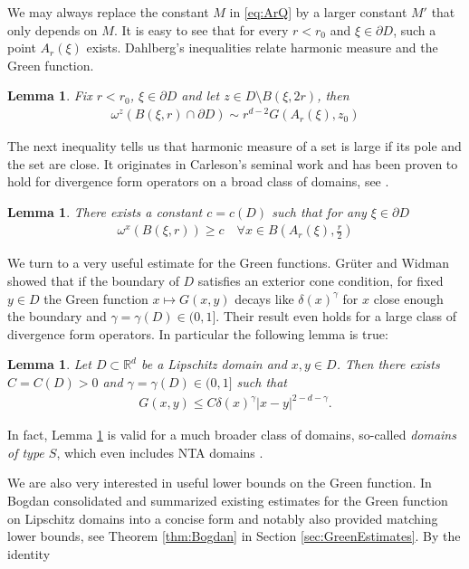 \documentclass[a4paper,12pt]{article}
\newtheorem{lemma}[theorem]{Lemma}
\theoremstyle{definition}
\theoremstyle{definition}
\begin{document}
	We may always replace the constant $M$ in \eqref{eq:ArQ} by a larger constant $M'$ that only depends on $M$. It is easy to see that for every $r<r_0$ and $\xi\in\partial D$, such a point $A_r(\xi)$ exists. Dahlberg's inequalities \cite{Dahlberg1977} relate harmonic measure and the Green function.
	\begin{lemma}\label{lem:Dahlberg}
		Fix $r<r_0$, $\xi\in\partial D$ and let $z\in D\setminus B(\xi,2r)$, then
		\begin{align}\label{eq:Dahlberg}
			\omega^z(B(\xi,r)\cap \partial D)\sim r^{d-2}G(A_r(\xi),z_0)
		\end{align}
	\end{lemma}
	The next inequality tells us that harmonic measure of a set is large if its pole and the set are close. It originates in Carleson's seminal work \cite{Carleson62} and has been proven to hold for divergence form operators on a broad class of domains, see \cite{Kenig94}.
	\begin{lemma}\label{lem:Carleson} 
		There exists a constant $c=c(D)$ such that	for any $\xi\in\partial D$
		\begin{align}
			\label{eq:Carleson}
			\omega^x(B(\xi,r))\geq c \quad\forall x\in B\left(A_r(\xi),\frac{r}{2}\right)
		\end{align}
	\end{lemma}
	We turn to a very useful estimate for the Green functions. Grüter and Widman \cite{GrueterWidman} showed that if the boundary of $D$ satisfies an exterior cone condition, for fixed $y\in D$ the Green function $x\mapsto G(x,y)$  decays like $\delta(x)^\gamma$ for $x$ close enough the boundary and $\gamma=\gamma(D)\in(0,1]$. Their result even holds for a large class of divergence form operators. In particular the following lemma is true:
	\begin{lemma}\label{lem:TypeSEst}
		Let $D\subset \mathbb R^d$ be a Lipschitz domain and $x,y\in D$. Then there exists $C=C(D)>0$ and $\gamma=\gamma(D)\in(0,1]$ such that 
		\begin{align*}
			G(x,y)\leq C \delta(x)^\gamma|x-y|^{2-d-\gamma}.
		\end{align*}
	\end{lemma}
	In fact, Lemma \ref{lem:TypeSEst} is valid for a much broader class of domains, so-called \textit{domains of type $S$}, which even includes NTA domains \cite{Kenig94}. \par
	We are also very interested in useful lower bounds on the Green function. In \cite{Bogdan2000} Bogdan consolidated and summarized existing estimates for the Green function on Lipschitz domains into a concise form and notably also provided matching lower bounds, see Theorem \ref{thm:Bogdan} in Section \ref{sec:GreenEstimates}. By the identity
\end{document}

